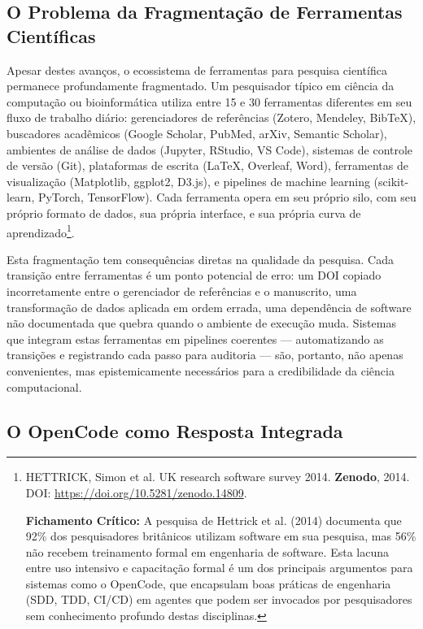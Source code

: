 \subsection{O Problema da Fragmentação de Ferramentas Científicas}

Apesar destes avanços, o ecossistema de ferramentas para pesquisa científica permanece profundamente fragmentado. Um pesquisador típico em ciência da computação ou bioinformática utiliza entre 15 e 30 ferramentas diferentes em seu fluxo de trabalho diário: gerenciadores de referências (Zotero, Mendeley, BibTeX), buscadores acadêmicos (Google Scholar, PubMed, arXiv, Semantic Scholar), ambientes de análise de dados (Jupyter, RStudio, VS Code), sistemas de controle de versão (Git), plataformas de escrita (LaTeX, Overleaf, Word), ferramentas de visualização (Matplotlib, ggplot2, D3.js), e pipelines de machine learning (scikit-learn, PyTorch, TensorFlow). Cada ferramenta opera em seu próprio silo, com seu próprio formato de dados, sua própria interface, e sua própria curva de aprendizado\footnote{
  HETTRICK, Simon et al. UK research software survey 2014. \textbf{Zenodo}, 2014. DOI: \url{https://doi.org/10.5281/zenodo.14809}.

  \textbf{Fichamento Crítico:} A pesquisa de Hettrick et al. (2014) documenta que 92\% dos pesquisadores britânicos utilizam software em sua pesquisa, mas 56\% não recebem treinamento formal em engenharia de software. Esta lacuna entre uso intensivo e capacitação formal é um dos principais argumentos para sistemas como o OpenCode, que encapsulam boas práticas de engenharia (SDD, TDD, CI/CD) em agentes que podem ser invocados por pesquisadores sem conhecimento profundo destas disciplinas.
}.

Esta fragmentação tem consequências diretas na qualidade da pesquisa. Cada transição entre ferramentas é um ponto potencial de erro: um DOI copiado incorretamente entre o gerenciador de referências e o manuscrito, uma transformação de dados aplicada em ordem errada, uma dependência de software não documentada que quebra quando o ambiente de execução muda. Sistemas que integram estas ferramentas em pipelines coerentes --- automatizando as transições e registrando cada passo para auditoria --- são, portanto, não apenas convenientes, mas epistemicamente necessários para a credibilidade da ciência computacional.

\subsection{O OpenCode como Resposta Integrada}

